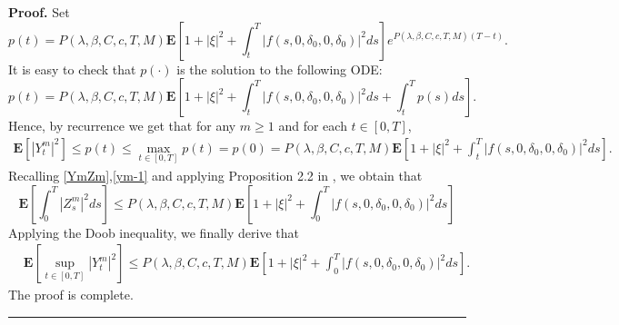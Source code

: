 \documentclass[10pt]{article}%
\numberwithin{equation}{section}
\newenvironment{proof}[1][Proof]{\noindent \textbf{#1.} }{\  \rule{0.5em}{0.5em}}
\def \E{\mathbf{E}}
\begin{document}
\begin{proof}
Set $$p(t)=P(\lambda,\beta,C,c,T,M)\E\left[1+\left|\xi\right|^2+\int_{t}^{T}\left|f(s,0,\delta_0,0,\delta_0)\right|^2ds\right]e^{P(\lambda,\beta,C,c,T,M)(T-t)}.$$
It is easy to check that $p(\cdot)$ is the solution to the following ODE:
$$p(t)=P(\lambda,\beta,C,c,T,M)\E\left[1+\left|\xi\right|^2+\int_{t}^{T}\left|f(s,0,\delta_0,0,\delta_0)\right|^2ds+\int_{t}^{T}p(s)ds\right].$$
Hence, by recurrence we get that for any $m\geq1$ and for each $t\in[0,T]$,
$$\begin{aligned}
 \E[\left|Y_t^m\right|^2]\leq p(t) \leq \max_{t\in[0,T]}p(t)=p(0)=P(\lambda,\beta,C,c,T,M)\E\left[1+\left|\xi\right|^2+\int_{t}^{T}\left|f(s,0,\delta_0,0,\delta_0)\right|^2ds\right].
\end{aligned}$$
Recalling \eqref{YmZm},\eqref{ym-1} and applying Proposition 2.2 in \cite{LLZ}, we obtain that
\begin{equation*}
\label{3-9}
\E\left[\int_{0}^{T}\left|Z_s^m\right|^2ds\right]\leq P(\lambda,\beta,C,c,T,M)\E\left[1+\left|\xi\right|^2+\int_{0}^{T}\left|f(s,0,\delta_0,0,\delta_0)\right|^2ds\right]   
\end{equation*}
Applying the Doob inequality, we finally derive that
\begin{equation*}
\begin{split}
 &\mathbf{E} \left[\sup_{t\in[0,T]}\left|Y_t^m\right|^2\right]\leq P(\lambda,\beta, C,c,T,M )\mathbf{E}\left[1+\left|\xi\right|^2+\int_{0}^{T}\left|f(s,0,\delta_0,0,\delta_0)\right|^2ds\right].
\end{split}    
\end{equation*}
The proof is complete.
\end{proof}
\end{document}
